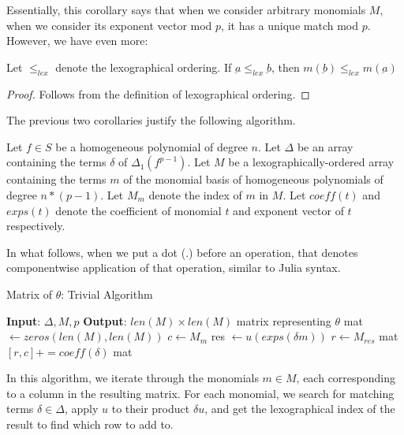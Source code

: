 Essentially, this corollary says that
when we consider arbitrary monomials \(M\),
when we consider its exponent vector 
mod \(p\), it has a unique
match mod \(p\).
However, we have even more:

\begin{cor}
	\label{cor:match:order}
	Let \(\leq_{lex}\) denote the 
	lexographical ordering.
	If \(\underbar{a} \leq_{lex} \underbar{b}\),
	then 
	\(m(\underbar{b}) \leq_{lex} m(\underbar{a})\)
\end{cor}

\begin{proof}
	Follows from the definition of lexographical
	ordering.
\end{proof}

The previous two corollaries justify
the following algorithm.

\begin{cxt}
	Let \(f \in S\) be a homogeneous
	polynomial of degree \(n\).
	Let \(\Delta\) be an array containing the 
	terms $\delta$ of \(\Delta_{1}(f^{p-1})\).
	Let \(M\) be a lexographically-ordered array containing the terms $m$ of the monomial basis of
	homogeneous polynomials of degree
	\(n*(p-1)\). Let $M_m$ denote the index of $m$ in $M$. Let $coeff(t)$ and $exps(t)$ denote the coefficient of monomial $t$ and exponent vector of $t$ respectively.
\end{cxt}

In what follows, when we put a dot (\(.\))
before an operation, that denotes
componentwise application
of that operation, similar to Julia syntax.

\begin{algorithm}[H]
    \caption{Matrix of $\theta$: Trivial Algorithm}
    \label{alg:matrix:trivial}
    \begin{algorithmic}[1]
    \State \textbf{Input}: $\Delta, M, p$
    \State \textbf{Output}: $len(M) \times len(M)$ matrix representing $\theta$
    \State mat $\gets zeros(len(M), len(M))$
        \State $c \gets M_{m}$
        \For{$\delta \in \Delta$}
             
                \State res $\gets u(exps(\delta m))$
                \State $r \gets M_{res}$
                \State mat $[r, c] += coeff(\delta)$
            \EndIf
        \EndFor
    \EndFor
    \State \Return mat
    \end{algorithmic}
\end{algorithm}

In this algorithm, we iterate through the monomials $m \in M$, each corresponding to a column in the
resulting matrix. For each monomial, we search for matching terms $\delta \in \Delta$, apply $u$ to their product $\delta u$, and 
get the lexographical index of the result to find which row to add to.

